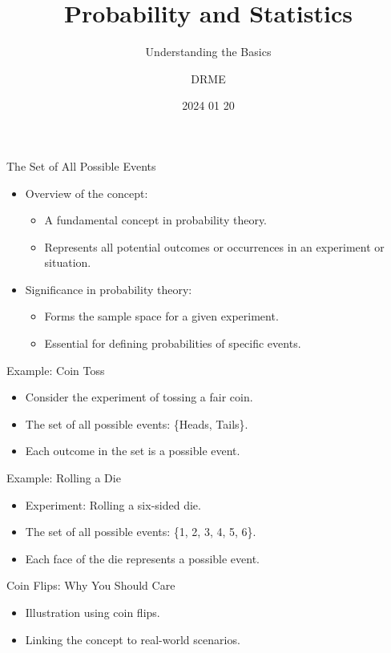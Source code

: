 \documentclass{beamer}
\begin{document}
\title{Probability and Statistics}
\subtitle{Understanding the Basics}
\author{DRME}
\date{2024 01 20}

\begin{frame}
  \titlepage
\end{frame}


\begin{frame}{The Set of All Possible Events}
  \begin{itemize}
    \item Overview of the concept:
      \begin{itemize}
        \item A fundamental concept in probability theory.
        \item Represents all potential outcomes or occurrences in an experiment or situation.
      \end{itemize}
    \item Significance in probability theory:
      \begin{itemize}
        \item Forms the sample space for a given experiment.
        \item Essential for defining probabilities of specific events.
      \end{itemize}
  \end{itemize}
\end{frame}

\begin{frame}{Example: Coin Toss}
  \begin{itemize}
    \item Consider the experiment of tossing a fair coin.
    \item The set of all possible events: \{Heads, Tails\}.
    \item Each outcome in the set is a possible event.
  \end{itemize}
\end{frame}

\begin{frame}{Example: Rolling a Die}
  \begin{itemize}
    \item Experiment: Rolling a six-sided die.
    \item The set of all possible events: \{1, 2, 3, 4, 5, 6\}.
    \item Each face of the die represents a possible event.
  \end{itemize}
\end{frame}

\begin{frame}{Coin Flips: Why You Should Care}
  \begin{itemize}
    \item Illustration using coin flips.
    \item Linking the concept to real-world scenarios.
  \end{itemize}
\end{frame}
\end{document}
